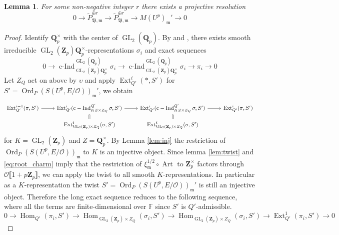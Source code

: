 \documentclass[leqno]{amsart}
\newtheorem{lem}[thm]{Lemma}
\theoremstyle{definition}
\theoremstyle{remark}
\newcommand{\oo}{\mathcal{O}}
\newcommand{\fF}{\mathbb{F}} %
\newcommand{\Qp}{\mathbf{Q}_p}
\newcommand{\Zp}{\mathbf{Z}_p}
\DeclareMathOperator{\Hom}{Hom}
\DeclareMathOperator{\Ext}{Ext}
\DeclareMathOperator{\cInd}{c-Ind}
\DeclareMathOperator{\GL}{GL}
\DeclareMathOperator{\Art}{Art}
\newcommand{\fm}{\mathfrak{m}}
\DeclareMathOperator{\Ord}{Ord} %
\newcommand{\B}{\mathfrak B} %
\begin{document}
\begin{lem}
	For some non-negative integer $r$
	there exists a projective resolution 
	\begin{equation}\label{eq:resolution}
	0\to \tilde{P}_{\B,\fm}^{\oplus r}\to 
	\tilde{P}_{\B,\fm}^{\oplus r}\to 
	M(U^p)_{\fm}'\to 0
	\end{equation}
\end{lem}
\begin{proof}
Identify $\Qp^\times$ with the center of $\GL_2(\Qp)$.
By \cite[Thm 33]{barthel} and \cite[Thm 19]{barthel}, 
there exists
smooth irreducible 
$\GL_2(\Zp)\Qp^\times$-representations $\sigma_i$
and exact sequences
\begin{equation}
	0\to 
	\cInd_{\GL_2(\Zp)\Qp^\times}^{\GL_2(\Qp)}\sigma_i\to
	\cInd_{\GL_2(\Zp)\Qp^\times}^{\GL_2(\Qp)}\sigma_i\to
	\pi_i\to 0
\end{equation}
Let $Z_Q$ act on above by $\upsilon$
and apply $\Ext^i_{Q'}(*,S')$
for $S'=\Ord_P(S(U^p,E/\oo))_{\fm}'$,
we obtain
\begin{equation*}
    \begin{tikzcd}[row sep=2ex]
	    \Ext^{i-1}_{Q'}
	    (\pi, S')\arrow[r] &
	    \Ext^{i}_{Q'}
        (\cInd_{KZ\times Z_Q}^{Q'}\sigma, S')
	    \arrow[r] \arrow[d,equal] &
	    \Ext^{i}_{Q'}
        (\cInd_{KZ\times Z_Q}^{Q'}\sigma, S')
	    \arrow[r] \arrow[d,equal] &
	    \Ext^{i}_{Q'}(\pi, S')\\ 
	 & \Ext^i_{\GL_2(\Zp)\times Z_Q}(\sigma ,S') &
	    \Ext^i_{\GL_2(\Zp)\times Z_Q}(\sigma ,S') &
    \end{tikzcd}
\end{equation*}
for $K=\GL_2(\Zp)$ and $Z=\Qp^\times$.
By Lemma \ref{lem:inj}
the restriction of $\Ord_P(S(U^p,E/\oo))_\fm$ to $K$
is an injective object.
Since lemma \ref{lem:twist} and \eqref{eq:root_charm} imply that 
the restriction of $\xi_{\fm}^{1/2}\circ \Art$ to $\Zp^\times$
factors through  $\oo\llbracket 1+p\Zp\rrbracket$,
we can apply the twist to all smooth $K$-representations.
In particular as a $K$-representation
the twist $S'=\Ord_P(S(U^p,E/\oo))_\fm'$
is still an injective object.
Therefore the long exact sequence reduces to 
the following sequence, where
all the terms are finite-dimensional over $\fF$
since $S'$ is $Q'$-admissible.
\begin{equation*}
	0 \to \Hom_{Q'}(\pi_i,S')\to 
	\Hom_{\GL_2(\Zp)\times Z_Q}(\sigma_i,S')\to 
	\Hom_{\GL_2(\Zp)\times Z_Q}(\sigma_i,S')\to 
	\Ext^1_{Q'}(\pi_i,S')\to 0
\end{equation*}




\end{proof}
\end{document}
